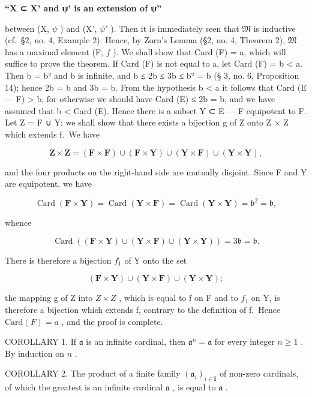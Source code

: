 \textbf{``X ⊂ X' and ψ' is an extension of ψ''}

between (X, \(\psi\) ) and (X', \(\psi'\) ). Then it is immediately seen that \(\mathfrak{M}\) is inductive (cf.~§2, no. 4, Example 2). Hence, by Zorn's Lemma (§2, no. 4, Theorem 2), \(\mathfrak{M}\) has a maximal element (F, \(f\) ). We shall show that Card (F) = a, which will suffice to prove the theorem. If Card (F) is not equal to a, let Card (F) = b \textless{} a. Then b = b² and b is infinite, and b ≤ 2b ≤ 3b ≤ b² = b (§ 3, no. 6, Proposition 14); hence 2b = b and 3b = b. From the hypothesis b \textless{} a it follows that Card (E --- F) \textgreater{} b, for otherwise we should have Card (E) ≤ 2b = b, and we have assumed that b \textless{} Card (E). Hence there is a subset Y ⊂ E --- F equipotent to F. Let Z = F ∪ Y; we shall show that there exists a bijection g of Z onto Z × Z which extends f.~We have

\[
\mathbf {Z} \times \mathbf {Z} = (\mathbf {F} \times \mathbf {F}) \cup (\mathbf {F} \times \mathbf {Y}) \cup (\mathbf {Y} \times \mathbf {F}) \cup (\mathbf {Y} \times \mathbf {Y}),
\]

and the four products on the right-hand side are mutually disjoint. Since F and Y are equipotent, we have

\[
\operatorname{Card} (\mathbf {F} \times \mathbf {Y}) = \operatorname{Card} (\mathbf {Y} \times \mathbf {F}) = \operatorname{Card} (\mathbf {Y} \times \mathbf {Y}) = \mathfrak {b} ^ {2} = \mathfrak {b},
\]

whence

\[
\operatorname{Card} ((\mathbf {F} \times \mathbf {Y}) \cup (\mathbf {Y} \times \mathbf {F}) \cup (\mathbf {Y} \times \mathbf {Y})) = 3 \mathfrak {b} = \mathfrak {b}.
\]

There is therefore a bijection \(f_{1}\) of Y onto the set

\[
(\mathbf {F} \times \mathbf {Y}) \cup (\mathbf {Y} \times \mathbf {F}) \cup (\mathbf {Y} \times \mathbf {Y});
\]

the mapping g of Z into \(Z \times Z\) , which is equal to f on F and to \(f_{1}\) on Y, is therefore a bijection which extends f, contrary to the definition of f.~Hence \(\text{Card}(F) = a\) , and the proof is complete.

COROLLARY 1. If \(\mathfrak{a}\) is an infinite cardinal, then \(\mathfrak{a}^n = \mathfrak{a}\) for every integer \(n \geqslant 1\) . By induction on \(n\) .

COROLLARY 2. The product of a finite family \((\mathfrak{a}_i)_{i\in \mathbf{I}}\) of non-zero cardinals, of which the greatest is an infinite cardinal \(\mathfrak{a}\) , is equal to \(\mathfrak{a}\) .

